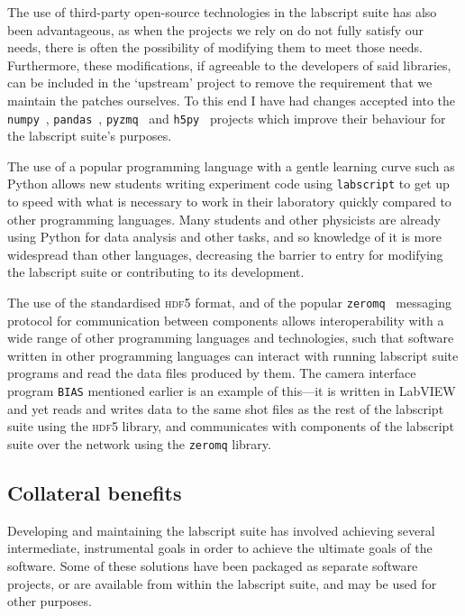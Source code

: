 The use of third-party open-source technologies in the labscript suite has also been advantageous, as when the projects we rely on do not fully satisfy our needs, there is often the possibility of modifying them to meet those needs. Furthermore, these modifications, if agreeable to the developers of said libraries, can be included in the `upstream' project to remove the requirement that we maintain the patches ourselves. To this end I have had changes accepted into the \texttt{numpy}~\cite{oliphant_guide_2015}, \texttt{pandas}~\cite{mckinney-proc-scipy-2010}, \texttt{pyzmq}~\cite{brian_e._granger_and_contributors_pyzmq_2018} and \texttt{h5py}~\cite{andrew_collette_and_contributors_h5py_2018} projects which improve their behaviour for the labscript suite's purposes. 

The use of a popular programming language with a gentle learning curve such as Python allows new students writing experiment code using \texttt{labscript} to get up to speed with what is necessary to work in their laboratory quickly compared to other programming languages. Many students and other physicists are already using Python for data analysis and other tasks, and so knowledge of it is more widespread than other languages, decreasing the barrier to entry for modifying the labscript suite or contributing to its development.

The use of the standardised \textsc{hdf5} format, and of the popular \texttt{zeromq}~\cite{zeromq_guide} messaging protocol for communication between components allows interoperability with a wide range of other programming languages and technologies, such that software written in other programming languages can interact with running labscript suite programs and read the data files produced by them. The camera interface program \texttt{BIAS} mentioned earlier is an example of this---it is written in LabVIEW and yet reads and writes data to the same shot files as the rest of the labscript suite using the \textsc{hdf5} library, and communicates with components of the labscript suite over the network using the \texttt{zeromq} library.


\subsection{Collateral benefits}

Developing and maintaining the labscript suite has involved achieving several intermediate, instrumental goals in order to achieve the ultimate goals of the software. Some of these solutions have been packaged as separate software projects, or are available from within the labscript suite, and may be used for other purposes.

